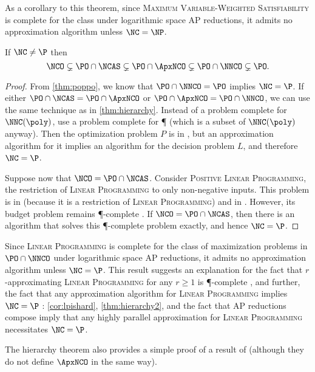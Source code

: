 \documentclass[]{article}
\begin{document}
As a corollary to this theorem, since \textsc{Maximum Variable-Weighted Satisfiability} is complete for the class \NNCO{} under logarithmic space AP reductions, it admits no \NC{} approximation algorithm unless $\NC = \NP$.

\begin{theorem}\label{thm:hierarchy2}
  If $\NC \neq \P$ then
  \begin{equation*}
    \NCO \subsetneq \PO \cap \NCAS \subsetneq \PO \cap \ApxNCO \subsetneq \PO \cap \NNCO \subsetneq \PO.
  \end{equation*}
\end{theorem}
\begin{proof}
  From \autoref{thm:poppo}, we know that $\PO \cap \NNCO = \PO$ implies $\NC = \P$.
  If either $\PO \cap \NCAS = \PO \cap \ApxNCO$ or $\PO \cap \ApxNCO = \PO \cap \NNCO$, we can use the same technique as in \autoref{thm:hierarchy}.
  Instead of a problem complete for $\NNC(\poly)$, use a problem complete for \P{} (which is a subset of $\NNC(\poly)$ anyway).
  Then the optimization problem $P$ is in \PO, but an \NC{} approximation algorithm for it implies an \NC{} algorithm for the decision problem $L$, and therefore $\NC = \P$.

  Suppose now that $\NCO = \PO \cap \NCAS$.
  Consider \textsc{Positive Linear Programming}, the restriction of \textsc{Linear Programming} to only non-negative inputs.
  This problem is in \PO{} (because it is a restriction of \textsc{Linear Programming}) and in \NCAS{} \cite{ln93}.
  However, its budget problem remains \P-complete \cite{tx98}.
  If $\NCO = \PO \cap \NCAS$, then there is an \NC{} algorithm that solves this \P-complete problem exactly, and hence $\NC = \P$.
\end{proof}

Since \textsc{Linear Programming} is complete for the class of maximization problems in $\PO \cap \NNCO$ under logarithmic space AP reductions, it admits no \NC{} approximation algorithm unless $\NC = \P$.
This result suggests an explanation for the fact that $r$-approximating \textsc{Linear Programming} for any $r \geq 1$ is \P-complete \cite[Theorem~8.2.7]{dsst97}, and further, the fact that any \NC{} approximation algorithm for \textsc{Linear Programming} implies $\NC = \P$ \cite[Theorem~8.2.8]{dsst97}: \autoref{cor:lpishard}, \autoref{thm:hierarchy2}, and the fact that AP reductions compose imply that any highly parallel approximation for \textsc{Linear Programming} necessitates $\NC = \P$.

The hierarchy theorem also provides a simple proof of a result of \cite{dsst97} (although they do not define $\ApxNCO$ in the same way).
\end{document}

